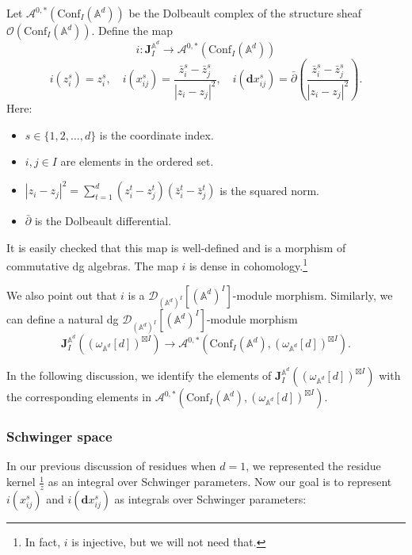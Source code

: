 \documentclass[11pt]{amsart}
\theoremstyle{definition}
\theoremstyle{remark}
\numberwithin{equation}{section}
\begin{document}
Let $\mathcal{A}^{0,*}(\mathrm{Conf}_{ I}(\mathbb{A}^d))$ be the Dolbeault complex of the structure sheaf $\mathcal{O}(\mathrm{Conf}_{ I}(\mathbb{A}^{d}))$. Define the map
$$
i:\mathbf{J}_{ I}^{\mathbb{A}^{d}}\rightarrow\mathcal{A}^{0,*}(\mathrm{Conf}_{ I}(\mathbb{A}^d))
$$
$$
i(z_{i}^{s}) = z_{i}^{s},\quad i(x_{ij}^{s}) = \frac{\bar{z}_{i}^{s} - \bar{z}_{j}^{s}}{|z_{i} - z_{j}|^{2}},\quad i(\mathbf{d}x_{ij}^{s}) = \bar{\partial}\left(\frac{\bar{z}_{i}^{s} - \bar{z}_{j}^{s}}{|z_{i} - z_{j}|^{2}}\right).
$$
Here:
\begin{itemize}
    \item \(s \in \{1,2,\dots,d\}\) is the coordinate index.
    \item \(i, j \in  I\) are elements in the ordered set.
    \item \(|z_{i} - z_{j}|^{2} = \sum_{t=1}^{d}(z_{i}^{t} - z_{j}^{t})(\bar{z}_{i}^{t} - \bar{z}_{j}^{t})\) is the squared norm.
    \item \(\bar{\partial}\) is the Dolbeault differential.
\end{itemize}
It is easily checked that this map is well-defined and is a morphism of commutative dg algebras.
The map $i$ is dense in cohomology.\footnote{In fact, $i$
is injective, but we will not need that.}

We also point out that $i$ is a $\mathcal{D}_{(\mathbb{A}^{d})^{ I}}[(\mathbb{A}^{d})^{ I}]$-module morphism.
Similarly, we can define a natural dg $\mathcal{D}_{(\mathbb{A}^{d})^{ I}}[(\mathbb{A}^{d})^{ I}]$-module
morphism
\[
  \mathbf{J}_{ I}^{\mathbb{A}^{d}}((\omega_{\mathbb{A}^{d}}[d])^{\boxtimes I}) \to \mathcal{A}^{0,*}
  (\mathrm{Conf}_{ I}(\mathbb{A}^d),(\omega_{\mathbb{A}^{d}}[d])^{\boxtimes I}) . 
\]

In the following discussion, we identify the elements of $\mathbf{J}_{ I}^{\mathbb{A}^{d}}((\omega_{\mathbb{A}^{d}}[d])^{\boxtimes I})$ with the corresponding elements in $\mathcal{A}^{0,*}(\mathrm{Conf}_{ I}(\mathbb{A}^d),(\omega_{\mathbb{A}^{d}}[d])^{\boxtimes I})$. 

\subsubsection{Schwinger space}

In our previous discussion of residues when $d=1$, we represented the residue kernel $\frac{1}{z}$ as an integral over Schwinger parameters.
Now our goal is to represent $i(x_{ij}^{s})$ and $i(\mathbf{d}x_{ij}^{s})$ as integrals over Schwinger parameters:
\end{document}
